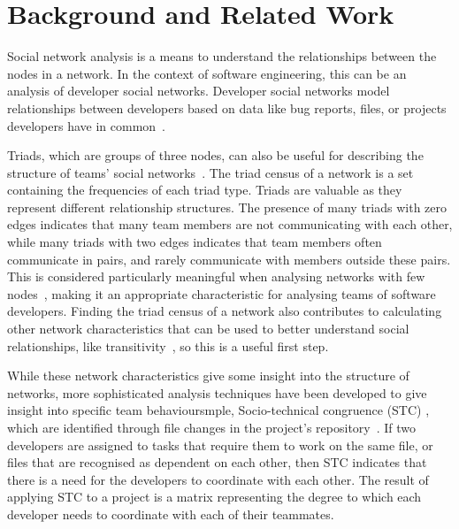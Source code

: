 \section{Background and Related Work}
\label{rel_work}
Social network analysis is a means to understand the relationships between the nodes in a network. In the context of software engineering, this can be an analysis of developer social networks. Developer social networks model relationships between developers based on data like bug reports, files, or projects developers have in common~\cite{zhangUnderstandingStudentTeachers2022}. 



Triads, which are groups of three nodes, can also be useful for describing the structure of teams' social networks~\cite{zverevaTriadCensusUsage2016}.  The triad census of a network is a set containing the frequencies of each triad type. Triads are valuable as they represent different relationship structures. The presence of many triads with zero edges indicates that many team members are not communicating with each other, while many triads with two edges indicates that team members often communicate in pairs, and rarely communicate with members outside these pairs. This is considered particularly meaningful when analysing networks with few nodes~\cite{frankSurveyStatisticalMethods1981}, making it an appropriate characteristic for analysing teams of software developers. Finding the triad census of a network also contributes to calculating other network characteristics that can be used to better understand social relationships, like transitivity~\cite{newmanClusteringPreferentialAttachment2001}, so this is a useful first step. 

While these network characteristics give some insight into the structure of networks, more sophisticated analysis techniques have been developed to give insight into specific team behavioursmple, Socio-technical congruence (STC) , which are identified through file changes in the project's repository~\cite{cataldoSociotechnicalCongruenceFramework2008}. If two developers are assigned to tasks that require them to work on the same file, or files that are recognised as dependent on each other, then STC indicates that there is a need for the developers to coordinate with each other. The result of applying STC to a project is a matrix representing the degree to which each developer needs to coordinate with each of their teammates. 

